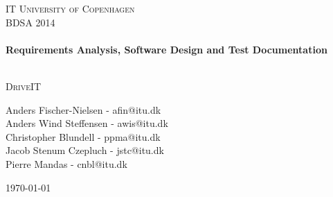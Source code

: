 


%


\begin{center}
\thispagestyle{empty}


\textsc{\LARGE IT University of Copenhagen}\\[1.5cm]

\textsc{\Large BDSA 2014 }\\[0.5cm]

\HRule \\[0.4cm]
{ \huge \bfseries Requirements Analysis, Software Design and Test Documentation \\ [0.4cm]
    }

\HRule \\[1cm]

\textsc{\Large DriveIT}\\[1.5cm]

\begin{minipage}{1\textwidth}
\begin{center} \large
Anders Fischer-Nielsen - afin@itu.dk\\
Anders Wind Steffensen - awis@itu.dk\\
Christopher Blundell - ppma@itu.dk\\
Jacob Stenum Czepluch - jstc@itu.dk\\
Pierre Mandas - cnbl@itu.dk\\
\end{center}
\end{minipage}


\vfill

{\large \today}

\end{center}

\frontmatter%

%
%


\tableofcontents
\newpage
\listoffigures
\newpage

\mainmatter%











